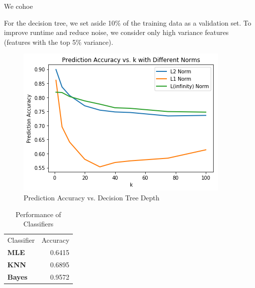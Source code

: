 \documentclass[twoside,11pt]{homework}
\begin{document}
	We cohoe
	
	For the decision tree, we set aside 10\% of the training data as a validation set. To improve runtime and reduce noise, we consider only high variance features (features with the top 5\% variance).
	
	\begin{figure}[H]
		\centering
		\includegraphics[scale=.5]{q6_fig/knn_k.png}	
		\caption{Prediction Accuracy vs. Decision Tree Depth}
	\end{figure}
	
		\begin{table}[H]
	\centering
	\caption{Performance of Classifiers}
	\begin{tabular}{lr}
		Classifier   & Accuracy \\
		\textbf{MLE}   & 0.6415    \\
		\textbf{KNN}   & 0.6895        \\
		\textbf{Bayes} & 0.9572
	\end{tabular}
	\end{table}
	
	
	
\end{document}
